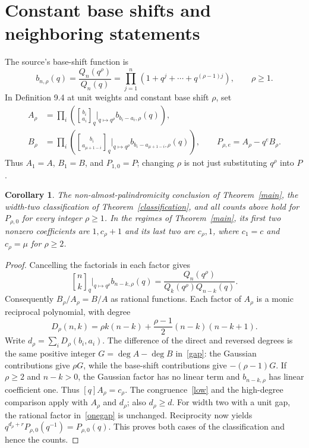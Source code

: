 \documentclass[11pt,a4paper]{article}
\newcommand{\qbin}[2]{\genfrac{[}{]}{0pt}{}{#1}{#2}_{q}}
\newtheorem{corollary}[theorem]{Corollary}
\begin{document}
\section{Constant base shifts and neighboring statements}

The source's base-shift function is
\[
 b_{n,\rho}(q)=\frac{Q_n(q^\rho)}{Q_n(q)}
 =\prod_{j=1}^{n}(1+q^j+\cdots+q^{(\rho-1)j}),\qquad \rho\ge1.
\]
In Definition 9.4 at unit weights and constant base shift $\rho$, set
\begin{align*}
 A_\rho&=\prod_i\left(\qbin{b_i}{a_i}\bigg|_{q\mapsto q^\rho}
                b_{b_i-a_i,\rho}(q)\right),\\
 B_\rho&=\prod_i\left(\qbin{b_i}{a_{\mu+1-i}}\bigg|_{q\mapsto q^\rho}
                b_{b_i-a_{\mu+1-i},\rho}(q)\right),\qquad
 P_{\rho,e}=A_\rho-q^eB_\rho.
\end{align*}
Thus $A_1=A$, $B_1=B$, and $P_{1,0}=P$; changing $\rho$ is not just
substituting $q^\rho$ into $P$.

\begin{corollary}\label{flatbase}
The non-almost-palindromicity conclusion of Theorem~\ref{main}, the
width-two classification of Theorem~\ref{classification}, and all counts
above hold for $P_{\rho,0}$ for every integer $\rho\ge1$.
In the regimes of Theorem~\ref{main}, its first two nonzero coefficients
are $1,c_\rho+1$ and its last two are $c_\rho,1$, where
$c_1=c$ and $c_\rho=\mu$ for $\rho\ge2$.
\end{corollary}
\begin{proof}
Cancelling the factorials in each factor gives
\[
 \qbin{n}{k}\bigg|_{q\mapsto q^\rho} b_{n-k,\rho}(q)
 =\frac{Q_n(q^\rho)}{Q_k(q^\rho)Q_{n-k}(q)}.
\]
Consequently $B_\rho/A_\rho=B/A$ as rational functions.
Each factor of $A_\rho$ is a monic reciprocal polynomial, with degree
\[
 D_\rho(n,k)=\rho k(n-k)+\frac{\rho-1}{2}(n-k)(n-k+1).
\]
Write $d_\rho=\sum_iD_\rho(b_i,a_i)$.
The difference of the direct and reversed degrees is the same positive
integer $G=\deg A-\deg B$ in~\eqref{gap}: the Gaussian contributions give
$\rho G$, while the base-shift contributions give $-(\rho-1)G$.
If $\rho\ge2$ and $n-k>0$, the Gaussian factor has no linear term
and $b_{n-k,\rho}$ has linear coefficient one. Thus
$[q]A_\rho=c_\rho$. The congruence~\eqref{low} and the high-degree
comparison apply with $A_\rho$ and $d_\rho$; also $d_\rho\ge d$.
For width two with a unit gap, the rational factor
in~\eqref{onegap} is unchanged. Reciprocity now yields
$q^{d_\rho+r}P_{\rho,0}(q^{-1})=P_{\rho,0}(q)$.
This proves both cases of the classification and hence the counts.
\end{proof}
\end{document}

